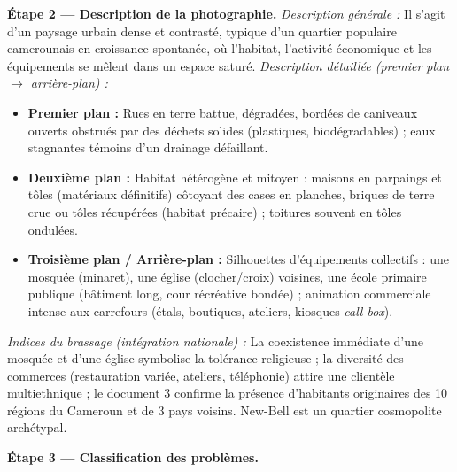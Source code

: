 \documentclass[11pt]{article}
\newcommand{\cle}[1]{{\popxbold\color{popdark}#1}}
\begin{document}
\begin{exoresolu}
\textbf{Étape 2 — Description de la photographie.}
\emph{Description générale :} Il s'agit d'un paysage urbain dense et contrasté, typique d'un quartier populaire camerounais en croissance spontanée, où l'habitat, l'activité économique et les équipements se mêlent dans un espace saturé.
\emph{Description détaillée (premier plan $\rightarrow$ arrière-plan) :}
\begin{itemize}
\item \textbf{Premier plan :} Rues en terre battue, dégradées, bordées de caniveaux ouverts obstrués par des déchets solides (plastiques, biodégradables) ; eaux stagnantes témoins d'un drainage défaillant.
\item \textbf{Deuxième plan :} Habitat hétérogène et mitoyen : maisons en parpaings et tôles (matériaux définitifs) côtoyant des cases en planches, briques de terre crue ou tôles récupérées (habitat précaire) ; toitures souvent en tôles ondulées.
\item \textbf{Troisième plan / Arrière-plan :} Silhouettes d'équipements collectifs : une mosquée (minaret), une église (clocher/croix) voisines, une école primaire publique (bâtiment long, cour récréative bondée) ; animation commerciale intense aux carrefours (étals, boutiques, ateliers, kiosques \emph{call-box}).
\end{itemize}
\emph{Indices du brassage (intégration nationale) :} La coexistence immédiate d'une mosquée et d'une église symbolise la tolérance religieuse ; la diversité des commerces (restauration variée, ateliers, téléphonie) attire une clientèle multiethnique ; le document 3 confirme la présence d'habitants originaires des 10 régions du Cameroun et de 3 pays voisins. New-Bell est un \cle{quartier cosmopolite} archétypal.

\textbf{Étape 3 — Classification des problèmes.}


\end{exoresolu}
\end{document}
